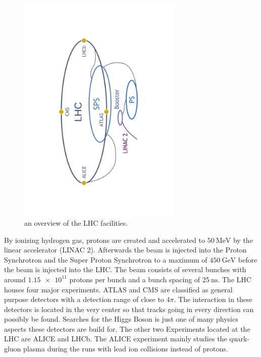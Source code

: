 \begin{figure}
  \centering
  \includegraphics[angle=-90, origin=c, width=0.7\textwidth]{plots/CERN_layout.pdf}
  \caption{an overview of the LHC facilities\cite{facilityCERN}.}
  \label{fig:CERN}
\end{figure}

By ionizing hydrogen gas, protons are created and accelerated to $\SI{50}{\mega\electronvolt}$ by the linear accelerator (LINAC 2). Afterwards the beam is injected into the Proton Synchrotron and the Super Proton Synchrotron to a maximum of $\SI{450}{\giga\electronvolt}$ before the beam is injected into the LHC.
The beam consists of several bunches with around $\num{1.15e11}$ protons per bunch and a bunch spacing of $\SI{25}{\nano\second}$.%
The LHC houses four major experiments. ATLAS and CMS are classified as general purpose detectors with a detection range of close to $4\pi$. The interaction in these detectors is located in the very center so that tracks going in every direction can possibly be found. Searches for the Higgs Boson is just one of many physics aspects these detectors are build for.
The other two Experiments located at the LHC are ALICE and LHCb.
The ALICE experiment mainly studies the quark-gluon plasma during the runs with lead ion collisions instead of protons.

